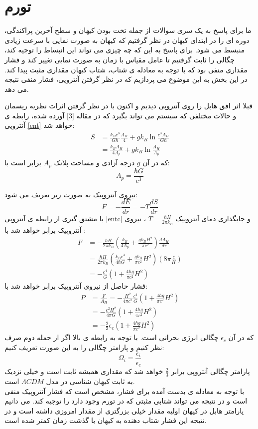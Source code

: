 \documentclass[12pt]{article}
\begin{document}
\pagebreak
\section{تورم}
ما برای پاسخ به یک سری سوالات از جمله تخت بودن کیهان و سطح آخرین پراکندگی، دوره ای را در ابتدای کیهان در نظر گرفتیم که کیهان به صورت نمایی با سرعت زیادی منبسط می شود.
برای پاسخ به این که چه چیزی می تواند این انبساط را توجیه کند، چگالی را ثابت گرفتیم تا عامل مقیاس با زمان به صورت نمایی تغییر کند و فشار مقداری منفی بود که با توجه 
به معادله ی شتاب، شتاب کیهان مقداری مثبت پیدا کند.
در این بخش به این موضوع می پردازیم که در نظر گرفتن آنتروپی، فشار منفی نتیجه می دهد. 

قبلا اثر افق هابل را روی آنتروپی دیدیم و اکنون با در نظر گرفتن اثرات نظریه ریسمان و حالات مختلفی که سیستم می تواند بگیرد که در مقاله [3] آورده شده، رابطه ی آنتروپی 
\eqref{ent}
 خواهد شد:
\begin{align}\label{entc}
S&=\frac{k_Bc^3}{G\hbar}\frac{A_H}{4}+gk_B\ln{\frac{c^3A_H}{G\hbar}}\nonumber \\
 &=\frac{k_BA_H}{4A_p}+gk_B\ln{\frac{A_H}{A_p}}
\end{align}
که در آن $g$ درجه آزادی و مساحت پلانک $A_p$ برابر است با:
$$A_p=\frac{\hbar G}{c^3}$$

نیروی آنتروپیک به صورت زیر تعریف می شود:
\begin{equation}
F=-\frac{dE}{dr}=-T\frac{dS}{dr}
\end{equation}
با مشتق گیری از رابطه ی آنتروپی 
\eqref{entc}
و جایگذاری دمای آنتروپیک
 $T=\frac{\hbar H}{2\pi k_B}$ 
، نیروی آنتروپیک برابر خواهد شد با :
\begin{align}
F&=-\frac{\hbar H}{2\pi k_B}(\frac{k_B}{4A_p}+\frac{gk_BH^2}{\pi c^2})\frac{dA_H}{dr}\nonumber \\
  &=\frac{\hbar H}{2\pi k_B}(\frac{k_Bc^3}{4\hbar G}+\frac{gk_B}{\pi c^2}H^2)(8\pi \frac{c}{H}) \nonumber \\
  &=-\frac{c^4}{G}(1+\frac{4\hbar g}{\pi c^2}H^2)
\end{align}
 فشار حاصل از نیروی آنتروپیک برابر خواهد شد با:
\begin{align}
P&=\frac{F}{A_H}=-\frac{H^2}{4\pi c^2}\frac{c^4}{G}(1+\frac{4\hbar g}{\pi c^2}H^2) \nonumber \\
 &=-\frac{c^2H^2}{4\pi G}(1+\frac{4\hbar g}{\pi c^2}H^2) \nonumber \\
 &=-\frac{2}{3}\epsilon_c (1+\frac{4\hbar g}{\pi c^2}H^2)
\end{align}
که در آن $\epsilon_c$ چگالی انرژی بحرانی است. با توجه به رابطه ی بالا اگر از جمله دوم صرف نظر کنیم و پارامتر چگالی را به این صورت تعریف کنیم:
$$\Omega_i=\frac{\epsilon_i}{\epsilon_c}$$
پارامتر چگالی آنتروپی برابر
 $\frac{2}{3}$ 
خواهد شد که مقداری همیشه ثابت است و خیلی نزدیک به ثابت کیهان شناسی در مدل $\Lambda CDM$ است.\\
با توجه به معادله ی بدست آمده برای فشار، مشخص است که فشار آنتروپیک منفی است و در نتیجه می تواند شتابی مثبتی که در تورم وجود دارد را توجیه کند. می دانیم پارامتر هابل
در کیهان اولیه مقدار خیلی بزرگتری از مقدار امروزی داشته است و در نتیجه این فشار شتاب دهنده به کیهان با گذشت زمان کمتر شده است.
\end{document}
